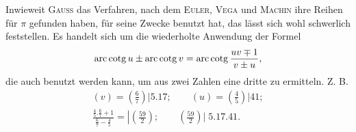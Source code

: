 Inwieweit \textsc{Gauss} das Verfahren, nach dem \textsc{Euler}, \textsc{Vega} und \textsc{Machin} ihre
Reihen für $\pi$ gefunden haben, für seine Zwecke benutzt hat, das lässt sich
wohl schwerlich feststellen. Es handelt sich um die wiederholte Anwendung
der Formel
\[
\operatorname{arc\,cotg} u\pm\operatorname{arc\,cotg} v=\operatorname{arc\,cotg}\frac{uv\mp1}{v\pm u},
\]
\noindent die auch benutzt werden kann, um aus zwei Zahlen eine dritte zu ermitteln.
Z. B.
\[
\begin{gathered}
(v)=\left(\tfrac{6}{7}\right)\big|5\mathord{.}17;\qquad
(u)=\left(\tfrac{4}{5}\right)\big|41;\\
\frac{\frac{4}{5}\mathord{.}\frac{6}{7}+1}{\frac{6}{7}-\frac{4}{5}}=\left|\left(\frac{59}{2}\right)\right.;\qquad
\left(\frac{59}{2}\right)\big|\;5\mathord{.}17\mathord{.}41.
\end{gathered}
\]
\clearpage\endgroup
